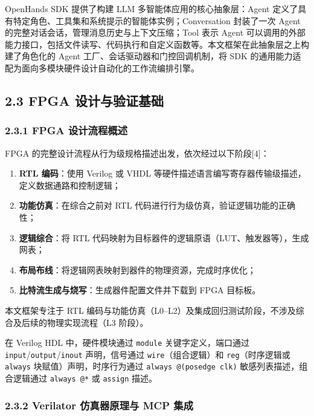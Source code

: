 OpenHands SDK 提供了构建 LLM 多智能体应用的核心抽象层：Agent
定义了具有特定角色、工具集和系统提示的智能体实例；Conversation
封装了一次 Agent 的完整对话会话，管理消息历史与上下文压缩；Tool 表示
Agent
可以调用的外部能力接口，包括文件读写、代码执行和自定义函数等。本文框架在此抽象层之上构建了角色化的
Agent 工厂、会话驱动器和门控回调机制，将 SDK
的通用能力适配为面向多模块硬件设计自动化的工作流编排引擎。

\subsection{2.3 FPGA
设计与验证基础}\label{fpga-ux8bbeux8ba1ux4e0eux9a8cux8bc1ux57faux7840}

\subsubsection{2.3.1 FPGA
设计流程概述}\label{fpga-ux8bbeux8ba1ux6d41ux7a0bux6982ux8ff0}

FPGA 的完整设计流程从行为级规格描述出发，依次经过以下阶段{[}4{]}：

\begin{enumerate}
\def\labelenumi{\arabic{enumi}.}
\tightlist
\item
  \textbf{RTL 编码}：使用 Verilog 或 VHDL
  等硬件描述语言编写寄存器传输级描述，定义数据通路和控制逻辑；
\item
  \textbf{功能仿真}：在综合之前对 RTL
  代码进行行为级仿真，验证逻辑功能的正确性；
\item
  \textbf{逻辑综合}：将 RTL
  代码映射为目标器件的逻辑原语（LUT、触发器等），生成网表；
\item
  \textbf{布局布线}：将逻辑网表映射到器件的物理资源，完成时序优化；
\item
  \textbf{比特流生成与烧写}：生成器件配置文件并下载到 FPGA 目标板。
\end{enumerate}

本文框架专注于 RTL
编码与功能仿真（L0--L2）及集成回归测试阶段，不涉及综合及后续的物理实现流程（L3
阶段）。

在 Verilog HDL 中，硬件模块通过 \texttt{module} 关键字定义，端口通过
\texttt{input}/\texttt{output}/\texttt{inout} 声明，信号通过
\texttt{wire}（组合逻辑）和 \texttt{reg}（时序逻辑或 \texttt{always}
块赋值）声明，时序行为通过 \texttt{always\ @(posedge\ clk)}
敏感列表描述，组合逻辑通过 \texttt{always\ @*} 或 \texttt{assign} 描述。

\subsubsection{2.3.2 Verilator 仿真器原理与 MCP
集成}\label{verilator-ux4effux771fux5668ux539fux7406ux4e0e-mcp-ux96c6ux6210}

